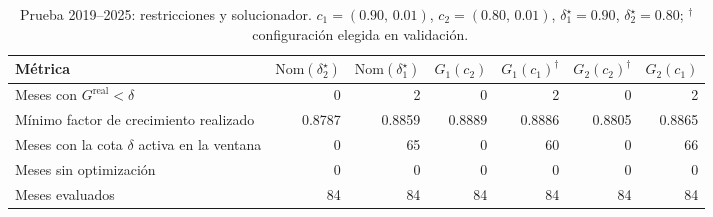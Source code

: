 \begin{table}[h]
\centering
\footnotesize
\setlength{\tabcolsep}{4pt}
\caption{Prueba 2019--2025: restricciones y solucionador. $c_1=(0.90,\,0.01)$, $c_2=(0.80,\,0.01)$, $\delta_1^\star=0.90$, $\delta_2^\star=0.80$; $^{\dagger}$~configuración elegida en validación.}\label{tab:r2_c}
\begin{tabular}{|l|r|r|r|r|r|r|}
\hline
\textbf{Métrica} & \textbf{$\mathrm{Nom}(\delta_2^\star)$} & \textbf{$\mathrm{Nom}(\delta_1^\star)$} & \textbf{$G_1(c_2)$} & \textbf{$G_1(c_1)^{\dagger}$} & \textbf{$G_2(c_2)^{\dagger}$} & \textbf{$G_2(c_1)$} \\ \hline
Meses con $G^{\mathrm{real}}<\delta$ & 0 & 2 & 0 & 2 & 0 & 2 \\ \hline
Mínimo factor de crecimiento realizado & 0.8787 & 0.8859 & 0.8889 & 0.8886 & 0.8805 & 0.8865 \\ \hline
Meses con la cota $\delta$ activa en la ventana & 0 & 65 & 0 & 60 & 0 & 66 \\ \hline
Meses sin optimización & 0 & 0 & 0 & 0 & 0 & 0 \\ \hline
Meses evaluados & 84 & 84 & 84 & 84 & 84 & 84 \\ \hline
\end{tabular}
\end{table}
